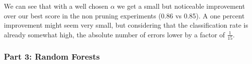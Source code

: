 \documentclass[
  letterpaper,
  DIV=11,
  numbers=noendperiod]{scrartcl}
\begin{document}
\begin{figure}
\begin{minipage}[t]{0.50\linewidth}
{{}

}

\end{minipage}%

\end{figure}

We can see that with a well chosen \(\alpha\) we get a small but
noticeable improvement over our best score in the non pruning
experiments (0.86 vs 0.85). A one percent improvement might seem very
small, but considering that the classification rate is already somewhat
high, the absolute number of errors lower by a factor of
\(\frac{1}{15}\).

\hypertarget{part-3-random-forests}{%
\subsubsection{Part 3: Random Forests}\label{part-3-random-forests}}
\end{document}
